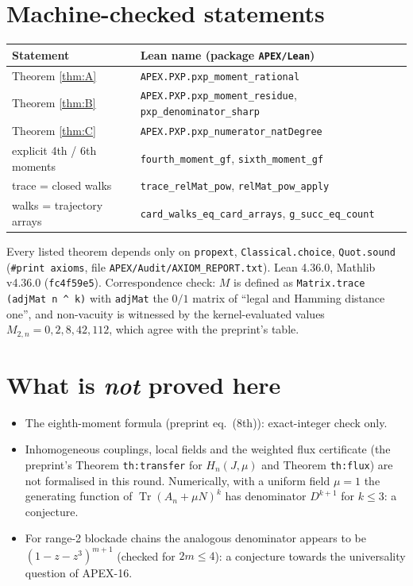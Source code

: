 \documentclass[10pt,a4paper]{article}
\theoremstyle{remark}\newtheorem{remark}[theorem]{Remark}
\newcommand{\Tr}{\operatorname{Tr}}
\begin{document}
\section{Machine-checked statements}
\begin{center}\small\begin{tabular}{ll}\toprule
Statement & Lean name (package \texttt{APEX/Lean})\\\midrule
Theorem \ref{thm:A} & \texttt{APEX.PXP.pxp\_moment\_rational}\\
Theorem \ref{thm:B} & \texttt{APEX.PXP.pxp\_moment\_residue}, \texttt{pxp\_denominator\_sharp}\\
Theorem \ref{thm:C} & \texttt{APEX.PXP.pxp\_numerator\_natDegree}\\
explicit 4th / 6th moments & \texttt{fourth\_moment\_gf}, \texttt{sixth\_moment\_gf}\\
trace = closed walks & \texttt{trace\_relMat\_pow}, \texttt{relMat\_pow\_apply}\\
walks = trajectory arrays & \texttt{card\_walks\_eq\_card\_arrays}, \texttt{g\_succ\_eq\_count}\\\bottomrule
\end{tabular}\end{center}
Every listed theorem depends only on \texttt{propext}, \texttt{Classical.choice}, \texttt{Quot.sound} (\texttt{\#print axioms}, file \texttt{APEX/Audit/AXIOM\_REPORT.txt}). Lean 4.36.0, Mathlib v4.36.0 (\texttt{fc4f59e5}). Correspondence check: $M$ is defined as \texttt{Matrix.trace (adjMat n \^{} k)} with \texttt{adjMat} the $0/1$ matrix of ``legal and Hamming distance one'', and non-vacuity is witnessed by the kernel-evaluated values $M_{2,n}=0,2,8,42,112$, which agree with the preprint's table.

\section{What is \emph{not} proved here}
\begin{itemize}
\item The eighth-moment formula (preprint eq.\ (8th)): exact-integer check only.
\item Inhomogeneous couplings, local fields and the weighted flux certificate (the preprint's Theorem \texttt{th:transfer} for $H_n(J,\mu)$ and Theorem \texttt{th:flux}) are not formalised in this round. Numerically, with a uniform field $\mu=1$ the generating function of $\Tr(A_n+\mu N)^k$ has denominator $D^{k+1}$ for $k\le3$: a conjecture.
\item For range-2 blockade chains the analogous denominator appears to be $(1-z-z^3)^{m+1}$ (checked for $2m\le4$): a conjecture towards the universality question of APEX-16.
\end{itemize}
\end{document}
